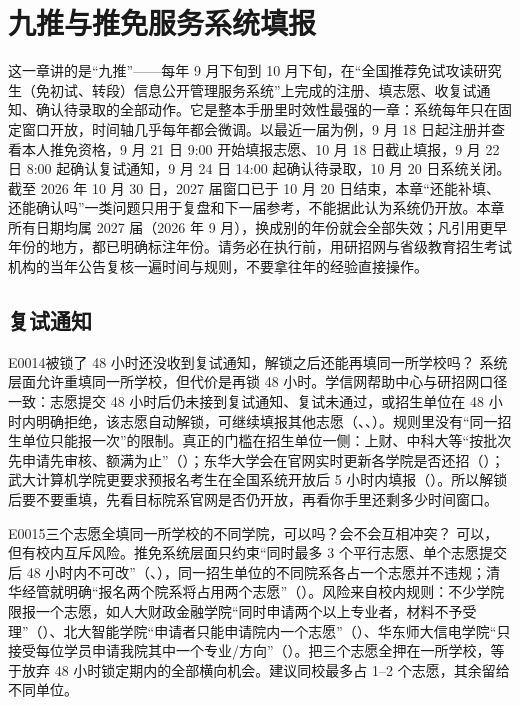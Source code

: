 \chapter{九推与推免服务系统填报}
\label{ch09}
\begin{keybox}
这一章讲的是“九推”——每年 9 月下旬到 10 月下旬，在“全国推荐免试攻读研究生（免初试、转段）信息公开管理服务系统”上完成的注册、填志愿、收复试通知、确认待录取的全部动作。它是整本手册里时效性最强的一章：系统每年只在固定窗口开放，时间轴几乎每年都会微调。以最近一届为例，9 月 18 日起注册并查看本人推免资格，9 月 21 日 9:00 开始填报志愿、10 月 18 日截止填报，9 月 22 日 8:00 起确认复试通知，9 月 24 日 14:00 起确认待录取，10 月 20 日系统关闭。截至 2026 年 10 月 30 日，2027 届窗口已于 10 月 20 日结束，本章“还能补填、还能确认吗”一类问题只用于复盘和下一届参考，不能据此认为系统仍开放。本章所有日期均属 2027 届（2026 年 9 月），换成别的年份就会全部失效；凡引用更早年份的地方，都已明确标注年份。请务必在执行前，用研招网与省级教育招生考试机构的当年公告复核一遍时间与规则，不要拿往年的经验直接操作。
\end{keybox}

\section{复试通知}
\begin{qa}{E0014}{被锁了 48 小时还没收到复试通知，解锁之后还能再填同一所学校吗？}
系统层面允许重填同一所学校，但代价是再锁 48 小时。学信网帮助中心与研招网口径一致：志愿提交 48 小时后仍未接到复试通知、复试未通过，或招生单位在 48 小时内明确拒绝，该志愿自动解锁，可继续填报其他志愿（、、）。规则里没有“同一招生单位只能报一次”的限制。真正的门槛在招生单位一侧：上财、中科大等“按批次先申请先审核、额满为止”（）；东华大学会在官网实时更新各学院是否还招（）；武大计算机学院更要求预报名考生在全国系统开放后 5 小时内填报（）。所以解锁后要不要重填，先看目标院系官网是否仍开放，再看你手里还剩多少时间窗口。
\end{qa}

\begin{qa}{E0015}{三个志愿全填同一所学校的不同学院，可以吗？会不会互相冲突？}
可以，但有校内互斥风险。推免系统层面只约束“同时最多 3 个平行志愿、单个志愿提交后 48 小时内不可改”（、），同一招生单位的不同院系各占一个志愿并不违规；清华经管就明确“报名两个院系将占用两个志愿”（）。风险来自校内规则：不少学院限报一个志愿，如人大财政金融学院“同时申请两个以上专业者，材料不予受理”（）、北大智能学院“申请者只能申请院内一个志愿”（）、华东师大信电学院“只接受每位学员申请我院其中一个专业/方向”（）。把三个志愿全押在一所学校，等于放弃 48 小时锁定期内的全部横向机会。建议同校最多占 1–2 个志愿，其余留给不同单位。
\end{qa}

